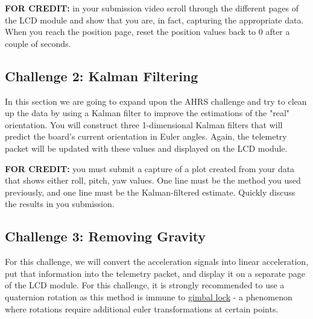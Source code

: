     \textbf{FOR CREDIT:} in your submission video scroll through the different pages of the LCD module and show that you are, in fact, capturing the appropriate data.
    When you reach the position page, reset the position values back to 0 after a couple of seconds.

    \subsection*{Challenge 2: Kalman Filtering}

    In this section we are going to expand upon the AHRS challenge and try to clean up the data by using a Kalman filter to improve the estimations of the "real" orientation.
    You will construct three 1-dimensional Kalman filters that will predict the board's current orientation in Euler angles.
    Again, the telemetry packet will be updated with these values and displayed on the LCD module.

    \textbf{FOR CREDIT:} you must submit a capture of a plot created from your data that shows either roll, pitch, yaw values.
    One line must be the method you used previously, and one line must be the Kalman-filtered estimate.
    Quickly discuss the results in you submission.

    \subsection*{Challenge 3: Removing Gravity}
    For this challenge, we will convert the acceleration signals into linear acceleration, put that information into the telemetry packet, and display it on a separate page of the LCD module.
    For this challenge, it is strongly recommended to use a quaternion rotation as this method is immune to \href{https://www.youtube.com/watch?v=zc8b2Jo7mno}{gimbal lock} - a phenomenon where rotations require additional euler transformations at certain points.


